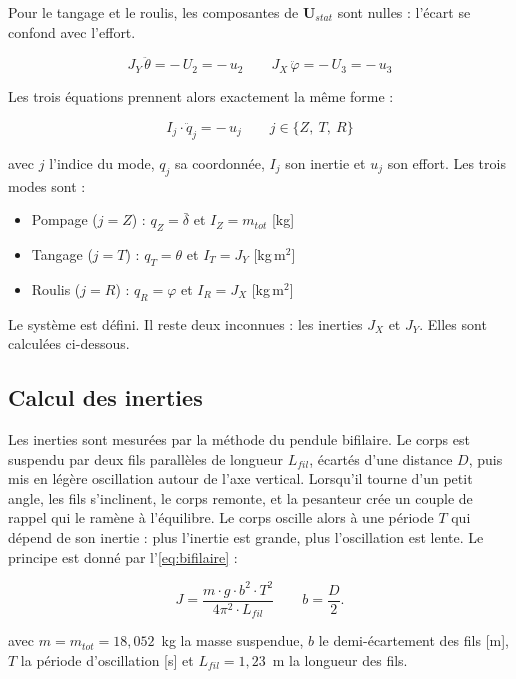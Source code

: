 Pour le tangage et le roulis, les composantes de $\boldsymbol{U}_{stat}$ sont nulles : l'écart se confond avec l'effort.

\begin{equation*}
    J_Y\,\ddot\theta = -\,U_2 = -\,u_2
    \qquad
    J_X\,\ddot\varphi = -\,U_3 = -\,u_3
\end{equation*}

Les trois équations prennent alors exactement la même forme :

\begin{equation}
    I_j \cdot \ddot q_j = -\,u_j
    \qquad j \in \{Z,\ T,\ R\}
    \label{eq:mode-dyn}
\end{equation}

avec $j$ l'indice du mode, $q_j$ sa coordonnée, $I_j$ son inertie et $u_j$ son effort. Les trois modes sont :
\begin{itemize}
    \item Pompage ($j = Z$) : $q_Z = \bar\delta$ et $I_Z = m_{tot}$ [kg]
    \item Tangage ($j = T$) : $q_T = \theta$ et $I_T = J_Y$ [kg\,m$^2$]
    \item Roulis ($j = R$) : $q_R = \varphi$ et $I_R = J_X$ [kg\,m$^2$]
\end{itemize}

Le système est défini. Il reste deux inconnues : les inerties $J_X$ et $J_Y$. Elles sont calculées ci-dessous.

\subsection{Calcul des inerties}
Les inerties sont mesurées par la méthode du pendule bifilaire. Le corps est suspendu par deux fils parallèles de longueur $L_{fil}$, écartés d'une distance $D$, puis mis en légère oscillation autour de l'axe vertical. Lorsqu'il tourne d'un petit angle, les fils s'inclinent, le corps remonte, et la pesanteur crée un couple de rappel qui le ramène à l'équilibre. Le corps oscille alors à une période $T$ qui dépend de son inertie : plus l'inertie est grande, plus l'oscillation est lente. Le principe est donné par l'\autoref{eq:bifilaire} :

\begin{equation}
    J = \frac{m \cdot g \cdot b^2 \cdot T^2}{4\pi^2 \cdot L_{fil}}
    \qquad b = \frac{D}{2}.
    \label{eq:bifilaire}
\end{equation}

avec $m = m_{tot} = 18{,}052$~kg la masse suspendue, $b$ le demi-écartement des fils [m], $T$ la période d'oscillation [s] et $L_{fil} = 1{,}23$~m la longueur des fils.

